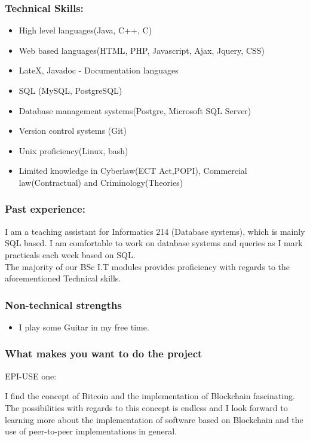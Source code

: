 \documentclass{article}
\begin{document}
	\subsubsection{Technical Skills:}
	\begin{itemize}
		\item High level languages(Java, C++, C)
		\item Web based languages(HTML, PHP, Javascript, Ajax, Jquery, CSS)
		\item LateX, Javadoc - Documentation languages
		\item SQL (MySQL, PostgreSQL)
		\item Database management systems(Postgre, Microsoft SQL Server)
		\item Version control systems (Git)
		\item Unix proficiency(Linux, bash)
		\item Limited knowledge in Cyberlaw(ECT Act,POPI), Commercial law(Contractual) and Criminology(Theories)
		
	\end{itemize}
	\subsubsection{Past experience:}
	I am a teaching assistant for Informatics 214 (Database systems), which is mainly SQL based. I am comfortable to work on database systems and queries as I mark practicals each week based on SQL. \\
	The majority of our BSc I.T modules provides proficiency with regards to the aforementioned Technical skills.
	\subsubsection{Non-technical strengths}
	\begin{itemize}
		\item I play some Guitar in my free time.
	\end{itemize}
	\subsubsection{What makes you want to do the project}
	EPI-USE one:
	
	I find the concept of Bitcoin and the implementation of Blockchain fascinating. The possibilities with regards to this concept is endless and I look forward to learning more about the implementation of software based on Blockchain and the use of peer-to-peer implementations in general.
	
\end{document}
